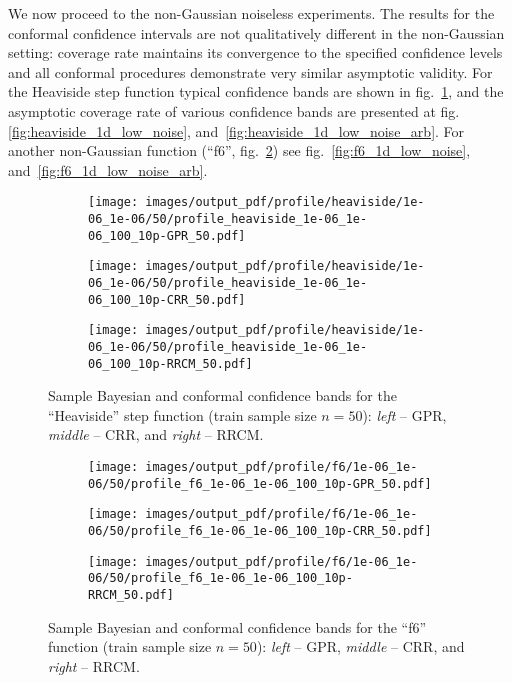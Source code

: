 \documentclass[a4paper,14pt]{extarticle}
\begin{document}
We now proceed to the non-Gaussian noiseless experiments. The results for the conformal
confidence intervals are not qualitatively different in the non-Gaussian setting:
coverage rate maintains its convergence to the specified confidence levels and all
conformal procedures demonstrate very similar asymptotic validity. For the Heaviside
step function typical confidence bands are shown in fig.~\ref{fig:nongauss_1d_heaviside},
and the asymptotic coverage rate of various confidence bands are presented at fig.~
\ref{fig:heaviside_1d_low_noise}, and~\ref{fig:heaviside_1d_low_noise_arb}. For another
non-Gaussian function (``f6'', fig.~\ref{fig:nongauss_1d_f6}) see fig.~\ref{fig:f6_1d_low_noise},
and~\ref{fig:f6_1d_low_noise_arb}.
\begin{figure}%
  \centering
  \begin{subfigure}[b]{0.33\linewidth}
    \texttt{[image: images/output\_pdf/profile/heaviside/1e-06\_1e-06/50/profile\_heaviside\_1e-06\_1e-06\_100\_10p-GPR\_50.pdf]}
  \end{subfigure}%
  \begin{subfigure}[b]{0.33\linewidth}
    \texttt{[image: images/output\_pdf/profile/heaviside/1e-06\_1e-06/50/profile\_heaviside\_1e-06\_1e-06\_100\_10p-CRR\_50.pdf]}
  \end{subfigure}%
  \begin{subfigure}[b]{0.33\linewidth}
    \texttt{[image: images/output\_pdf/profile/heaviside/1e-06\_1e-06/50/profile\_heaviside\_1e-06\_1e-06\_100\_10p-RRCM\_50.pdf]}
  \end{subfigure}
  \caption{Sample Bayesian and conformal confidence bands for the ``Heaviside'' step
  function (train sample size $n=50$): \textit{left} -- GPR, \textit{middle} -- CRR,
  and \textit{right} -- RRCM.}
  \label{fig:nongauss_1d_heaviside}
\end{figure}
\begin{figure}%
  \centering
  \begin{subfigure}[b]{0.33\linewidth}
    \texttt{[image: images/output\_pdf/profile/f6/1e-06\_1e-06/50/profile\_f6\_1e-06\_1e-06\_100\_10p-GPR\_50.pdf]}
  \end{subfigure}%
  \begin{subfigure}[b]{0.33\linewidth}
    \texttt{[image: images/output\_pdf/profile/f6/1e-06\_1e-06/50/profile\_f6\_1e-06\_1e-06\_100\_10p-CRR\_50.pdf]}
  \end{subfigure}%
  \begin{subfigure}[b]{0.33\linewidth}
    \texttt{[image: images/output\_pdf/profile/f6/1e-06\_1e-06/50/profile\_f6\_1e-06\_1e-06\_100\_10p-RRCM\_50.pdf]}
  \end{subfigure}
  \caption{Sample Bayesian and conformal confidence bands for the ``f6'' function
  (train sample size $n=50$): \textit{left} -- GPR, \textit{middle} -- CRR, and
  \textit{right} -- RRCM.}
  \label{fig:nongauss_1d_f6}
\end{figure}
\end{document}
